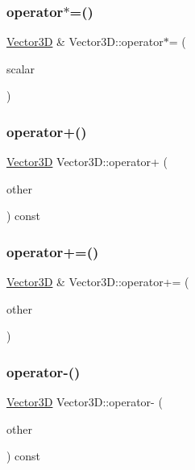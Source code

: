 \subsubsection{\texorpdfstring{operator$\ast$=()}{operator*=()}}
{\footnotesize\ttfamily \mbox{\hyperlink{classVector3D}{Vector3D}} \& Vector3\+D\+::operator$\ast$= (\begin{DoxyParamCaption}\item[{const double \&}]{scalar }\end{DoxyParamCaption})}

\mbox{\label{classVector3D_ae5153e5e26852627ccea88d399e13c6e}} 
\subsubsection{\texorpdfstring{operator+()}{operator+()}}
{\footnotesize\ttfamily \mbox{\hyperlink{classVector3D}{Vector3D}} Vector3\+D\+::operator+ (\begin{DoxyParamCaption}\item[{const \mbox{\hyperlink{classVector3D}{Vector3D}} \&}]{other }\end{DoxyParamCaption}) const}

\mbox{\label{classVector3D_a546241ecc51e49e05e7672ffde26bbf8}} 
\subsubsection{\texorpdfstring{operator+=()}{operator+=()}}
{\footnotesize\ttfamily \mbox{\hyperlink{classVector3D}{Vector3D}} \& Vector3\+D\+::operator+= (\begin{DoxyParamCaption}\item[{const \mbox{\hyperlink{classVector3D}{Vector3D}} \&}]{other }\end{DoxyParamCaption})}

\mbox{\label{classVector3D_a2d77fde2d4f484a639cb4dfd500c3540}} 
\subsubsection{\texorpdfstring{operator-\/()}{operator-()}}
{\footnotesize\ttfamily \mbox{\hyperlink{classVector3D}{Vector3D}} Vector3\+D\+::operator-\/ (\begin{DoxyParamCaption}\item[{const \mbox{\hyperlink{classVector3D}{Vector3D}} \&}]{other }\end{DoxyParamCaption}) const}

